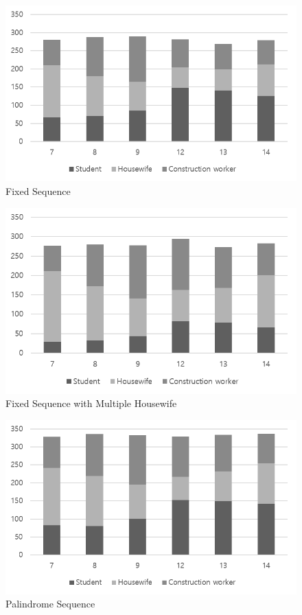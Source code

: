 \documentclass{scsSimAUDPaperFormat}
\begin{document}
\begin{figure}[!h]
    \centering
    \includegraphics[width=1.0\columnwidth]{experiment_result/FixedSequence.png}
    \caption{Fixed Sequence}
    \label{Fig:Fixed Sequence}
\end{figure}
\begin{figure}[!h]
    \centering
    \includegraphics[width=1.0\columnwidth]{experiment_result/withmultipleHousewife.png}
    \caption{Fixed Sequence with Multiple Housewife}
    \label{Fig:Fixed Sequence with Multiple Housewife}
\end{figure}
\begin{figure}[!h]
    \centering
    \includegraphics[width=1.0\columnwidth]{experiment_result/PalindromeSequence.png}
    \caption{Palindrome Sequence}
    \label{Fig:Palindrome Sequence}
\end{figure}
\end{document}
